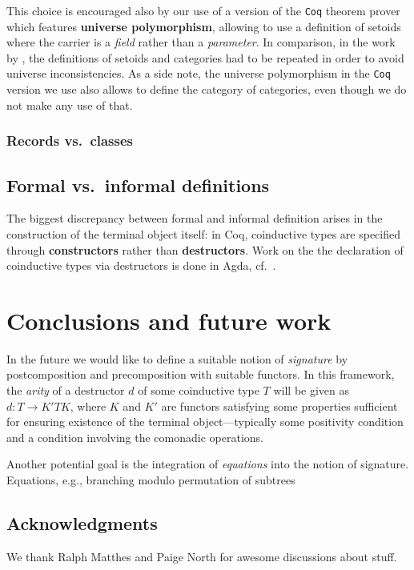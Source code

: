 \documentclass{amsart}
\newcommand{\fat}[1]{\textbf{#1}}
\begin{document}
This choice is encouraged also by our use of a version of the \texttt{Coq} theorem prover which features \fat{universe polymorphism},
allowing to use a definition of setoids where the carrier is a \emph{field} rather than a \emph{parameter}.
In comparison, in the work by \textcite{concat}, the definitions of setoids and categories had to be repeated in order to avoid
universe inconsistencies.
As a side note, the universe polymorphism in the \texttt{Coq} version we use also allows to define the category of categories, even though
we do not make any use of that.

\subsubsection{Records vs.\ classes}

\subsection{Formal vs.\ informal definitions}


The biggest discrepancy between formal and informal definition arises in the construction of the terminal object itself:
in \textsf{Coq}, coinductive types are specified through \fat{constructors} rather than \fat{destructors}.
Work on the the declaration of coinductive types via destructors is done in \textsf{Agda}, cf.\ \parencite{DBLP:conf/popl/AbelPTS13}.

\section{Conclusions and future work}


In the future we would like to define a suitable notion of \emph{signature} 
by postcomposition and precomposition with suitable functors. In this framework, the \emph{arity} of 
a destructor $d$ of some coinductive type $T$ will be given as $d : T \to K'TK$, where $K$ and $K'$ are 
functors satisfying some properties sufficient for ensuring existence of the terminal object---typically some 
positivity condition and a condition involving the comonadic operations.
 
Another potential goal is the integration of \emph{equations} into the notion of signature. 
 Equations, e.g., branching modulo permutation of subtrees

\subsection*{Acknowledgments}
 We thank Ralph Matthes and Paige North for awesome discussions about stuff.

\printbibliography

\newpage
\appendix


\end{document}
